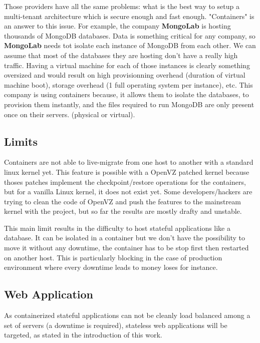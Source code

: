 Those providers have all the same problems: what is the best way to setup a
multi-tenant architecture which is secure enough and fast enough. "Containers"
is an answer to this issue. For example, the company \textbf{MongoLab} is hosting
thousands of MongoDB databases. Data is something critical for any company, so
\textbf{MongoLab} needs tot isolate each instance of MongoDB from each other.
We can assume that most of the databases they are hosting don't have a really high
traffic. Having a virtual machine for each of those instances is clearly something
oversized and would result on high provisionning overhead (duration of virtual
machine boot), storage overhead (1 full operating system per instance), etc.
This company is using containers because, it allows them to isolate the databases,
to provision them instantly, and the files required to run MongoDB are
only present once on their servers. (physical or virtual).

\subsection{Limits}

Containers are not able to live-migrate from one host to another with a
standard linux kernel yet. This feature is possible with a OpenVZ patched
kernel because thoses patches implement the checkpoint/restore operations for
the containers, but for a vanilla Linux kernel, it does not exist yet. Some
developers/hackers are trying to clean the code of OpenVZ and push the features
to the mainstream kernel with the \cite{websiteCRIU} project, but so far the
results are mostly drafty and unstable.

This main limit results in the difficulty to host stateful applications like a
database. It can be isolated in a container but we don't have the possibility
to move it without any downtime, the container has to be stop first then
restarted on another host. This is particularly blocking in the case of
production environment where every downtime leads to money loses for instance.

\subsection{Web Application}

As containerized stateful applications can not be cleanly load balanced among a
set of servers (a downtime is required), stateless web applications will be
targeted, as stated in the introduction of this work.

